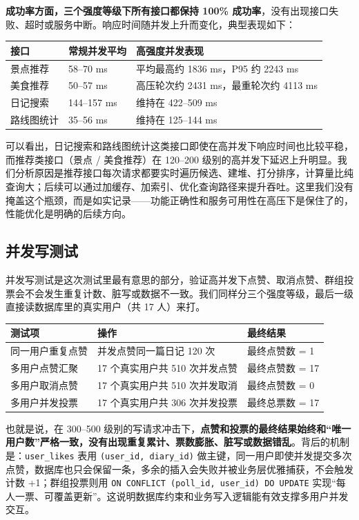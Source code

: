 \documentclass[UTF8,a4paper,12pt]{ctexart}
\begin{document}
\textbf{成功率方面，三个强度等级下所有接口都保持 100\% 成功率}，没有出现接口失败、超时或服务中断。响应时间随并发上升而变化，典型表现如下：

\begin{longtable}{lll}
\toprule
\textbf{接口} & \textbf{常规并发平均} & \textbf{高强度并发表现} \\
\midrule
\endhead
景点推荐 & 58--70 ms & 平均最高约 1836 ms，P95 约 2243 ms \\
美食推荐 & 50--57 ms & 高压轮次约 2431 ms，最重轮次约 4113 ms \\
日记搜索 & 144--157 ms & 维持在 422--509 ms \\
路线图统计 & 35--56 ms & 维持在 125--144 ms \\
\bottomrule
\end{longtable}

可以看出，日记搜索和路线图统计这类接口即使在高并发下响应时间也比较平稳，而推荐类接口（景点 / 美食推荐）在 120--200 级别的高并发下延迟上升明显。我们分析原因是推荐接口每次请求都要实时遍历候选、建堆、打分排序，计算量比纯查询大；后续可以通过加缓存、加索引、优化查询路径来提升吞吐。这里我们没有掩盖这个瓶颈，而是如实记录——功能正确性和服务可用性在高压下是保住了的，性能优化是明确的后续方向。

\subsection{并发写测试}
并发写测试是这次测试里最有意思的部分，验证高并发下点赞、取消点赞、群组投票会不会发生重复计数、脏写或数据不一致。我们同样分三个强度等级，最后一级直接读数据库里的真实用户（共 17 人）来打。

\begin{longtable}{lll}
\toprule
\textbf{测试项} & \textbf{操作} & \textbf{最终结果} \\
\midrule
\endhead
同一用户重复点赞 & 并发点赞同一篇日记 120 次 & 最终点赞数 = 1 \\
多用户点赞汇聚 & 17 个真实用户共 510 次并发点赞 & 最终点赞数 = 17 \\
多用户取消点赞 & 17 个真实用户共 510 次并发取消 & 最终点赞数 = 0 \\
多用户并发投票 & 17 个真实用户共 306 次并发投票 & 最终总票数 = 17 \\
\bottomrule
\end{longtable}

也就是说，在 300--500 级别的写请求冲击下，\textbf{点赞和投票的最终结果始终和“唯一用户数”严格一致，没有出现重复累计、票数膨胀、脏写或数据错乱}。背后的机制是：\texttt{user\_likes} 表用 \texttt{(user\_id, diary\_id)} 做主键，同一用户即使并发提交多次点赞，数据库也只会保留一条，多余的插入会失败并被业务层优雅捕获，不会触发计数 +1；群组投票则用 \texttt{ON CONFLICT (poll\_id, user\_id) DO UPDATE} 实现“每人一票、可覆盖更新”。这说明数据库约束和业务写入逻辑能有效支撑多用户并发交互。
\end{document}
